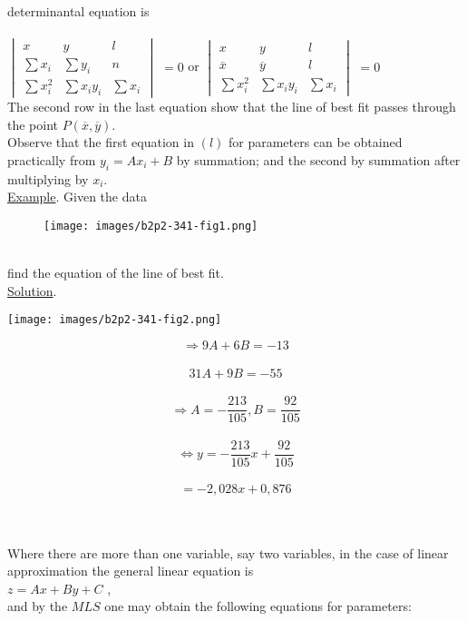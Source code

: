 \documentclass[11pt]{amsbook}
\begin{document}
	determinantal equation is \\\\
	$\begin{vmatrix}
		x&  y&  l \\
		\sum{x_i}& \sum{y_i}&  n \\
		\sum{x_i^2}& \sum{x_iy_i}& \sum{x_i}
	\end{vmatrix}$ $ = 0 $ or  
	$\begin{vmatrix}
	x&  y&  l \\
	\overline{x}& \overline{y}&  l \\
	\sum{x_i^2}& \sum{x_iy_i}& \sum{x_i}
	\end{vmatrix}$ $ = 0 $  \\
	
	 The second row in the last equation show that the line of best fit passes through the point $P (\overline{x}, \overline{y}) $. \\
	 
	 Observe that the first equation in $ (l) $ for parameters can be obtained practically from $ y_i = Ax_i + B $ by summation; and the second by summation after multiplying by $ x_i $. \\
	 
	 \underline{Example}. Given the data \\
	 \begin{figure}[htbp]
	 	\centering
	 	\texttt{[image: images/b2p2-341-fig1.png]}
	 \end{figure} \\ 
	find the equation of the line of best fit. \\
	\hspace{5pt} \underline{Solution}. \\
	
	\begin{minipage}{0.3\textwidth}
		\raggedright
		\texttt{[image: images/b2p2-341-fig2.png]} 
	\end{minipage}%
    \hfill%
	\begin{minipage}{0.6\textwidth}\raggedright
			\[ \Longrightarrow 9A + 6B = -13 \]\\
		\[31A + 9B = -55 \]\\
		\[ \Longrightarrow A = -\dfrac{213}{105}, B = \dfrac{92}{105} \] \\
		\[ \Longleftrightarrow y= -\dfrac{213}{105}x + \dfrac{92}{105} \] \\
		\[ = -2,028x + 0,876\]
	\end{minipage} \\\\
		Where there are more than one variable, say two variables, in the case of linear approximation the general linear equation is \\
		
		 $ z= Ax+By+C $ , \\
		 
		and by the $MLS$ one may obtain the following equations for parameters:

		
	
	 
	 
	
\end{document}
